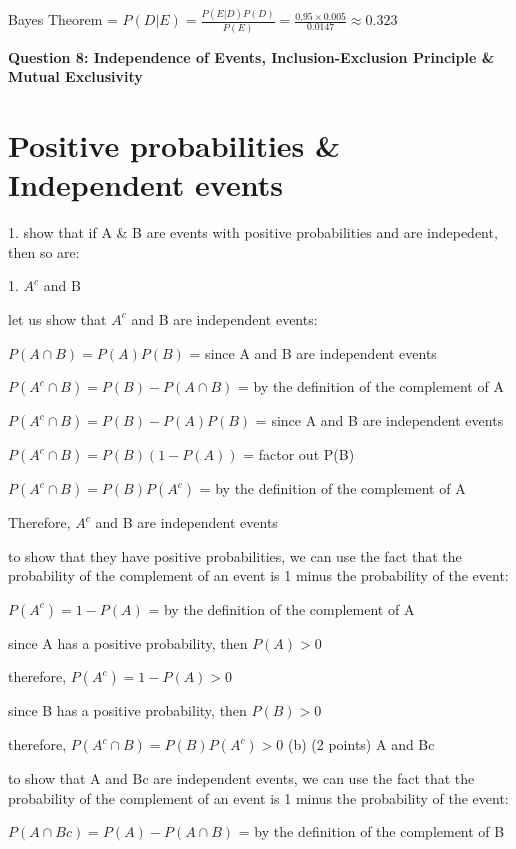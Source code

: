 \documentclass{article}
\begin{document}
Bayes Theorem = \(P(D|E) = \frac{P(E|D)P(D)}{P(E)} = \frac{0.95 \times 0.005}{0.0147} \approx 0.323\)

\begin{center}
    \large \textbf{Question 8: Independence of Events, Inclusion-Exclusion Principle \& Mutual Exclusivity}
\end{center}

\section{Positive probabilities \& Independent events}
1. show that if A \& B are events with positive probabilities and are indepedent, then so are:

1. \(A^c\) and B 

let us show that \(A^c\) and B are independent events:

\(P(A \cap B) = P(A)P(B)\) = since A and B are independent events

\(P(A^c \cap B) = P(B) - P(A \cap B)\) = by the definition of the complement of A

\(P(A^c \cap B) = P(B) - P(A)P(B)\) = since A and B are independent events

\(P(A^c \cap B) = P(B)(1 - P(A))\) = factor out P(B)

\(P(A^c \cap B) = P(B)P(A^c)\) = by the definition of the complement of A

Therefore, \(A^c\) and B are independent events\newline

to show that they have positive probabilities, we can use the fact that the probability of the complement of an event is 1 minus the probability of the event:

\(P(A^c) = 1 - P(A)\) = by the definition of the complement of A

since A has a positive probability, then \(P(A) > 0\)

therefore, \(P(A^c) = 1 - P(A) > 0\)

since B has a positive probability, then \(P(B) > 0\)

therefore, \(P(A^c \cap B) = P(B)P(A^c) > 0\)   \newline
(b) (2 points) A and Bc

to show that A and Bc are independent events, we can use the fact that the probability of the complement of an event is 1 minus the probability of the event:

\(P(A \cap Bc) = P(A) - P(A \cap B)\) = by the definition of the complement of B
\end{document}
